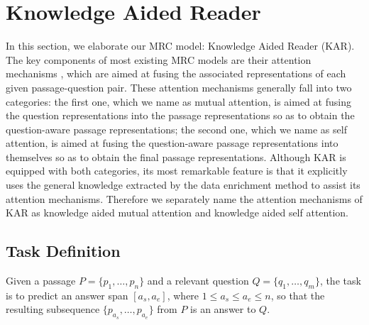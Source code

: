 \documentclass[11pt,a4paper]{article}
\begin{document}
\section{Knowledge Aided Reader}
In this section, we elaborate our MRC model: Knowledge Aided Reader (KAR). The key components of most existing MRC models are their attention mechanisms \cite{bahdanaudzmitry:2014}, which are aimed at fusing the associated representations of each given passage-question pair. These attention mechanisms generally fall into two categories: the first one, which we name as mutual attention, is aimed at fusing the question representations into the passage representations so as to obtain the question-aware passage representations; the second one, which we name as self attention, is aimed at fusing the question-aware passage representations into themselves so as to obtain the final passage representations. Although KAR is equipped with both categories, its most remarkable feature is that it explicitly uses the general knowledge extracted by the data enrichment method to assist its attention mechanisms. Therefore we separately name the attention mechanisms of KAR as knowledge aided mutual attention and knowledge aided self attention.

\subsection{Task Definition}
Given a passage $P = \{p_1, \ldots, p_n\}$ and a relevant question $Q = \{q_1, \ldots, q_m\}$, the task is to predict an answer span $[a_s, a_e]$, where $1 \le a_s \le a_e \le n$, so that the resulting subsequence $\{p_{a_s}, \ldots, p_{a_e}\}$ from $P$ is an answer to $Q$.
\end{document}
